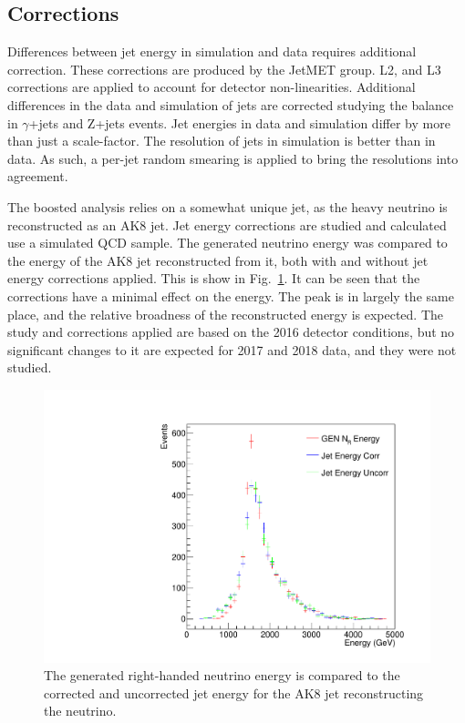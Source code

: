 \subsection{Corrections}
Differences between jet energy in simulation and data requires additional correction.  These corrections are produced by the \CMS JetMET group.  L2, and L3 corrections are applied to account for detector non-linearities.  Additional differences in the data and simulation of jets are corrected studying the \pt balance in \ensuremath{\gamma}+jets and Z+jets events.  Jet energies in data and simulation differ by more than just a scale-factor.  The resolution of jets in simulation is better than in data.  As such, a per-jet random smearing is applied to bring the resolutions into agreement.

The boosted analysis relies on a somewhat unique jet, as the heavy neutrino is reconstructed as an AK8 jet. Jet energy corrections are studied and calculated use a simulated QCD sample.  The generated neutrino energy was compared to the energy of the AK8 jet reconstructed from it, both with and without jet energy corrections applied.  This is show in Fig.~\ref{fig:jetEvsNRE}.  It can be seen that the corrections have a minimal effect on the energy.  The peak is in largely the same place, and the relative broadness of the reconstructed energy is expected.  The study and corrections applied are based on the 2016 detector conditions, but no significant changes to it are expected for 2017 and 2018 data, and they were not studied.

\begin{figure}[!tp]
    \centering
    \includegraphics[width=\textwidth]{figures/JetEnergyVsNeutrinoEnergy_3000_400.pdf}
    \caption[
       Reconstructed Jet Energy vs Generated Neutrino Energy.
    ]{
        The generated right-handed neutrino energy is compared to the corrected and uncorrected jet energy for the AK8 jet reconstructing the neutrino. 
    }
    \label{fig:jetEvsNRE}
\end{figure}

